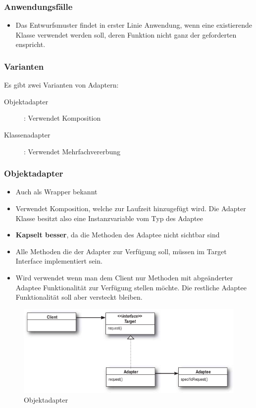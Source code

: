 \subsubsection{Anwendungsfälle}
\begin{itemize}
	\item Das Entwurfsmuster findet in erster Linie Anwendung, wenn eine existierende Klasse verwendet werden soll, deren Funktion nicht ganz der geforderten enspricht.
\end{itemize}

\subsubsection{Varianten} 
Es gibt zwei Varianten von Adaptern:
\begin{description}
	\item[Objektadapter]: Verwendet Komposition
	\item[Klassenadapter]: Verwendet Mehrfachvererbung
\end{description}


\clearpage

\subsubsection{Objektadapter}
\begin{itemize}
	\item Auch als Wrapper bekannt
	\item Verwendet Komposition, welche zur Laufzeit hinzugefügt wird. Die Adapter Klasse besitzt also eine Instanzvariable vom Typ des Adaptee
	\item \textbf{Kapselt besser}, da die Methoden des Adaptee nicht sichtbar sind
	\item Alle Methoden die der Adapter zur Verfügung soll, müssen im Target Interface implementiert sein.
	\item Wird verwendet wenn man dem Client nur Methoden mit abgeänderter Adaptee Funktionalität zur Verfügung stellen möchte. Die restliche Adaptee Funktionalität soll aber versteckt bleiben.
\end{itemize}

\begin{figure}[h]
	\centering
	\includegraphics[width=0.7\linewidth]{images/adapter_pattern}
	\caption{Objektadapter}
	\label{fig:adapterpattern}
\end{figure}

